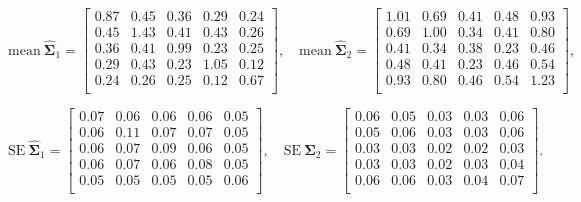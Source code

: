 \documentclass[12pt]{article}
\newcommand{\bSigma}{\boldsymbol{\Sigma}}
\begin{document}
\begin{table}[!ht]
\begin{equation*}
\text{mean}~\hat{\bSigma}_1 =
\begin{bmatrix}
0.87 & 0.45 & 0.36 & 0.29 & 0.24 \\ 
0.45 & 1.43 & 0.41 & 0.43 & 0.26 \\ 
0.36 & 0.41 & 0.99 & 0.23 & 0.25 \\ 
0.29 & 0.43 & 0.23 & 1.05 & 0.12 \\ 
0.24 & 0.26 & 0.25 & 0.12 & 0.67 \\ 
\end{bmatrix}, \quad
\text{mean}~\hat{\bSigma}_2 =
\begin{bmatrix}
1.01 & 0.69 & 0.41 & 0.48 & 0.93 \\ 
0.69 & 1.00 & 0.34 & 0.41 & 0.80 \\ 
 0.41 & 0.34 & 0.38 & 0.23 & 0.46 \\ 
 0.48 & 0.41 & 0.23 & 0.46 & 0.54 \\ 
0.93 & 0.80 & 0.46 & 0.54 & 1.23 \\ 
\end{bmatrix},
\end{equation*}


\begin{equation*}
\text{SE}~\hat{\bSigma}_1 =
\begin{bmatrix}
0.07 & 0.06 & 0.06 & 0.06 & 0.05 \\ 
0.06 & 0.11 & 0.07 & 0.07 & 0.05 \\ 
0.06 & 0.07 & 0.09 & 0.06 & 0.05 \\ 
0.06 & 0.07 & 0.06 & 0.08 & 0.05 \\ 
0.05 & 0.05 & 0.05 & 0.05 & 0.06 \\ 
\end{bmatrix}, \quad
\text{SE}~\hat{\bSigma}_2=
\begin{bmatrix}
0.06 & 0.05 & 0.03 & 0.03 & 0.06 \\ 
0.05 & 0.06 & 0.03 & 0.03 & 0.06 \\ 
0.03 & 0.03 & 0.02 & 0.02 & 0.03 \\ 
0.03 & 0.03 & 0.02 & 0.03 & 0.04 \\ 
0.06 & 0.06 & 0.03 & 0.04 & 0.07 \\ 
\end{bmatrix}.
\end{equation*}
\end{table}

\newpage



\end{document}
